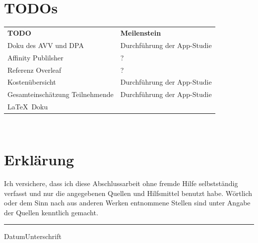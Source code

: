 

\maketitle
\clearpage
\thispagestyle{empty}
% 
~
\newpage



\clearpage


      ~
      \newpage
      \vfill
      \section*{TODOs}
      \begin{tabular}{l|l}
        \textbf{TODO} & \textbf{Meilenstein} \\
        Doku des AVV und DPA & Durchführung der App-Studie \\
        Affinity Publilsher & ? \\
        Referenz Overleaf & ? \\
        Kostenübersicht & Durchführung der App-Studie \\
        Gesamteinschätzung Teilnehmende & Durchführung der App-Studie \\
	\LaTeX~Doku & \\
      \end{tabular}
      \vfill
      \clearpage
      ~
      \newpage

\vspace{10ex}
\section*{Erklärung}
Ich versichere, dass ich diese Abschlussarbeit ohne fremde Hilfe selbstständig
verfasst und nur die angegebenen Quellen und  Hilfsmittel benutzt  habe. Wörtlich
oder dem  Sinn nach  aus anderen  Werken entnommene Stellen  sind unter  Angabe der
Quellen kenntlich gemacht.
\vspace{10ex}

\hrule
{\small{Datum}}\hfill{\small{Unterschrift}}


\tableofcontents
\listoffigures


